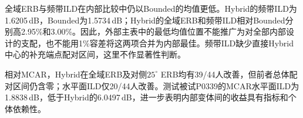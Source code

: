 全域ERB与频带ILD在内部比较中仍以Bounded的均值更低。Hybrid的频带ILD为1.6205\,dB，Bounded为1.5734\,dB；Hybrid的全域ERB和频带ILD相对Bounded分别高2.95\%和3.00\%。因此，外部主表中的最低均值位置不能推广为对全部内部设计的支配，也不能用1\%容差将这两项合并为内部最佳。频带ILD缺少直接Hybrid中心的补充端点配对区间，这里不作显著性判断。

相对MCAR，Hybrid在全域ERB及对侧$25^\circ$ ERB均有39/44人改善，但前者总体配对区间仍含零；水平面ILD仅20/44人改善。测试被试P0339的MCAR水平面ILD为1.8838\,dB，低于Hybrid的6.0497\,dB，进一步表明内部变体间的收益具有指标和个体依赖性。
\FloatBarrier
